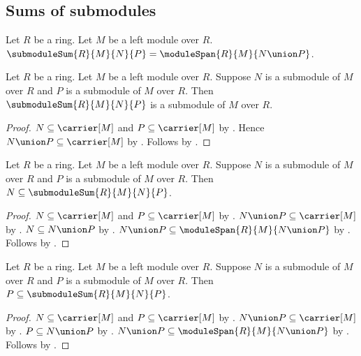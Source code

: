 \subsection{Sums of submodules}

\begin{definition}\label{submodule_sum}
    Let $R$ be a ring.
    Let $M$ be a left module over $R$.
    $\submoduleSum{R}{M}{N}{P}=\moduleSpan{R}{M}{N\union P}$.
\end{definition}

\begin{theorem}\label{submodule_sum_is_submodule}
    Let $R$ be a ring.
    Let $M$ be a left module over $R$.
    Suppose $N$ is a submodule of $M$ over $R$ and
        $P$ is a submodule of $M$ over $R$.
    Then $\submoduleSum{R}{M}{N}{P}$ is a submodule of $M$ over $R$.
\end{theorem}
\begin{proof}
    $N\subseteq\carrier[M]$ and $P\subseteq\carrier[M]$ by
        .
    Hence $N\union P\subseteq\carrier[M]$ by
        .
    Follows by .
\end{proof}

\begin{proposition}\label{submodule_sum_left}
    Let $R$ be a ring.
    Let $M$ be a left module over $R$.
    Suppose $N$ is a submodule of $M$ over $R$ and
        $P$ is a submodule of $M$ over $R$.
    Then $N\subseteq\submoduleSum{R}{M}{N}{P}$.
\end{proposition}
\begin{proof}
    $N\subseteq\carrier[M]$ and $P\subseteq\carrier[M]$ by
        .
    $N\union P\subseteq\carrier[M]$ by
        .
    $N\subseteq N\union P$ by .
    $N\union P\subseteq\moduleSpan{R}{M}{N\union P}$ by
        .
    Follows by .
\end{proof}

\begin{proposition}\label{submodule_sum_right}
    Let $R$ be a ring.
    Let $M$ be a left module over $R$.
    Suppose $N$ is a submodule of $M$ over $R$ and
        $P$ is a submodule of $M$ over $R$.
    Then $P\subseteq\submoduleSum{R}{M}{N}{P}$.
\end{proposition}
\begin{proof}
    $N\subseteq\carrier[M]$ and $P\subseteq\carrier[M]$ by
        .
    $N\union P\subseteq\carrier[M]$ by
        .
    $P\subseteq N\union P$ by .
    $N\union P\subseteq\moduleSpan{R}{M}{N\union P}$ by
        .
    Follows by .
\end{proof}


